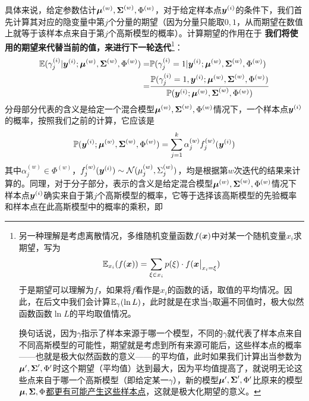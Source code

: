 \documentclass[a4paper,UTF8]{article}
\begin{document}
具体来说，给定参数估计\(\boldsymbol{\mu}^{(w)},\boldsymbol{\Sigma}^{(w)},\Phi^{(w)}\)，对于给定样本点\(\boldsymbol{y}^{(i)}\)的条件下，我们首先计算其对应的隐变量中第\(j\)个分量的期望（因为分量只能取\(0,1\)，从而期望在数值上就等于该样本点来自于第\(j\)个高斯模型的概率）。计算期望的作用在于\textbf{ 我们将使用\myvec{\gamma}的期望来代替当前\myvec{\gamma}的值，来进行下一轮迭代}\footnote{
    另一种理解是考虑离散情况，多维随机变量函数\(f(\boldsymbol{x})\)中对某一个随机变量\(x_i\)求期望，写为\[\mathbb{E}_{x_i}(f(\boldsymbol{x}))=\sum_{\xi\in x_i}p(\xi)\cdot f(\boldsymbol{x}\big|_{x_i=\xi})\]于是期望可以理解为\(f\)，如果将\(f\)看作是\(x_i\)的函数的话，取值的平均情况。因此，在后文中我们会计算\(\mathbb{E}_\gamma(\ln L)\)，此时就是在求当\(\gamma\)取遍不同值时，极大似然函数函数\(\ln L\)的平均取值情况。

    换句话说，因为\(\gamma\)指示了样本来源于哪一个模型，不同的\(\gamma\)就代表了样本点来自不同高斯模型的可能性，期望就是考虑到所有来源可能后，这些样本点的概率——也就是极大似然函数的意义——的平均值，此时如果我们计算出当参数为\(\boldsymbol{\mu}',\boldsymbol{\Sigma}',\Phi'\)时这个期望（平均值）达到最大，因为平均值提高了，就说明无论这些点来自于哪一个高斯模型（即给定某一\(\gamma\)），新的模型\(\boldsymbol{\mu}',\boldsymbol{\Sigma}',\Phi'\)比原来的模型\(\boldsymbol{\mu},\boldsymbol{\Sigma},\Phi\)\underline{都更有可能产生这些样本点}，这就是极大化期望的意义。
}：\begin{equation*}
    \begin{split}
        \mathbb{E}(
            \gamma^{(i)}_j|\boldsymbol{y}^{(i)};\boldsymbol{\mu}^{(w)},\boldsymbol{\Sigma}^{(w)},\Phi^{(w)}
        )
        =&\mathbb{P}(\gamma^{(i)}_j=1|\boldsymbol{y}^{(i)};\boldsymbol{\mu}^{(w)},\boldsymbol{\Sigma}^{(w)},\Phi^{(w)})\\
        =&\frac{
            \mathbb{P}(\gamma^{(i)}_j=1,\boldsymbol{y}^{(i)};\boldsymbol{\mu}^{(w)},\boldsymbol{\Sigma}^{(w)},\Phi^{(w)})
        }{
            \mathbb{P}(\boldsymbol{y}^{(i)};\boldsymbol{\mu}^{(w)},\boldsymbol{\Sigma}^{(w)},\Phi^{(w)})
        }
    \end{split}
\end{equation*}分母部分代表的含义是给定一个混合模型\(\boldsymbol{\mu}^{(w)},\boldsymbol{\Sigma}^{(w)},\Phi^{(w)}\)情况下，一个样本点\(\boldsymbol{y}^{(i)}\)的概率，按照我们之前的计算，它应该是\begin{equation*}
    \mathbb{P}(\boldsymbol{y}^{(i)};\boldsymbol{\mu}^{(w)},\boldsymbol{\Sigma}^{(w)},\Phi^{(w)})=\sum_{j=1}^k\alpha^{(w)}_jf^{(w)}_j(\boldsymbol{y}^{(i)})
\end{equation*}其中\(\alpha^{(w)}_j\in\Phi^{(w)}\)，\(f^{(w)}_j(\boldsymbol{y}^{(i)})\sim\mathcal{N}(\mu^{(w)}_j,\Sigma^{(w)}_j)\)，均是根据第\(w\)次迭代的结果来计算的。同理，对于分子部分，表示的含义是给定混合模型\(\boldsymbol{\mu}^{(w)},\boldsymbol{\Sigma}^{(w)},\Phi^{(w)}\)情况下样本点\(\boldsymbol{y}^{(i)}\)确实来自于第\(j\)个高斯模型的概率，它等于选择该高斯模型的先验概率和样本点在此高斯模型中的概率的乘积，即\begin{equation*}

\end{equation*}
\end{document}
